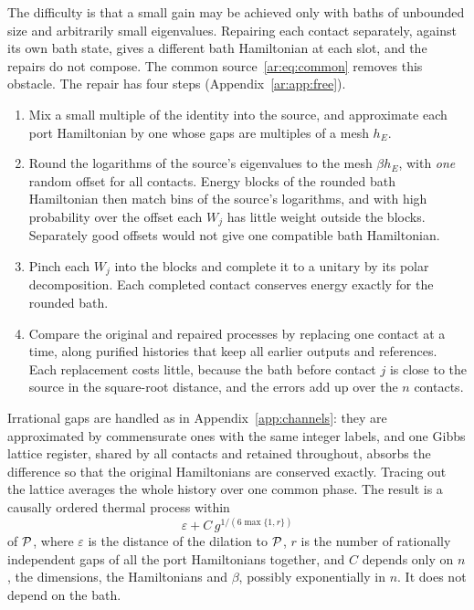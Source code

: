 The difficulty is that a small gain may be achieved only with baths of unbounded size and arbitrarily small eigenvalues. Repairing each contact separately, against its own bath state, gives a different bath Hamiltonian at each slot, and the repairs do not compose. The common source~\eqref{ar:eq:common} removes this obstacle. The repair has four steps (Appendix~\ref{ar:app:free}).
\begin{enumerate}[label=(\roman*)]
\item Mix a small multiple of the identity into the source, and approximate each port Hamiltonian by one whose gaps are multiples of a mesh $h_E$.
\item Round the logarithms of the source's eigenvalues to the mesh $\beta h_E$, with \emph{one} random offset for all contacts. Energy blocks of the rounded bath Hamiltonian then match bins of the source's logarithms, and with high probability over the offset each $W_j$ has little weight outside the blocks. Separately good offsets would not give one compatible bath Hamiltonian.
\item Pinch each $W_j$ into the blocks and complete it to a unitary by its polar decomposition. Each completed contact conserves energy exactly for the rounded bath.
\item Compare the original and repaired processes by replacing one contact at a time, along purified histories that keep all earlier outputs and references. Each replacement costs little, because the bath before contact $j$ is close to the source in the square-root distance, and the errors add up over the $n$ contacts.
\end{enumerate}
Irrational gaps are handled as in Appendix~\ref{app:channels}: they are approximated by commensurate ones with the same integer labels, and one Gibbs lattice register, shared by all contacts and retained throughout, absorbs the difference so that the original Hamiltonians are conserved exactly. Tracing out the lattice averages the whole history over one common phase. The result is a causally ordered thermal process within
\begin{equation}\label{ar:eq:modulus}
\varepsilon+C\,g^{1/(6\max\{1,r\})}
\end{equation}
of $\mathcal P$, where $\varepsilon$ is the distance of the dilation to $\mathcal P$, $r$ is the number of rationally independent gaps of all the port Hamiltonians together, and $C$ depends only on $n$, the dimensions, the Hamiltonians and $\beta$, possibly exponentially in $n$. It does not depend on the bath.

